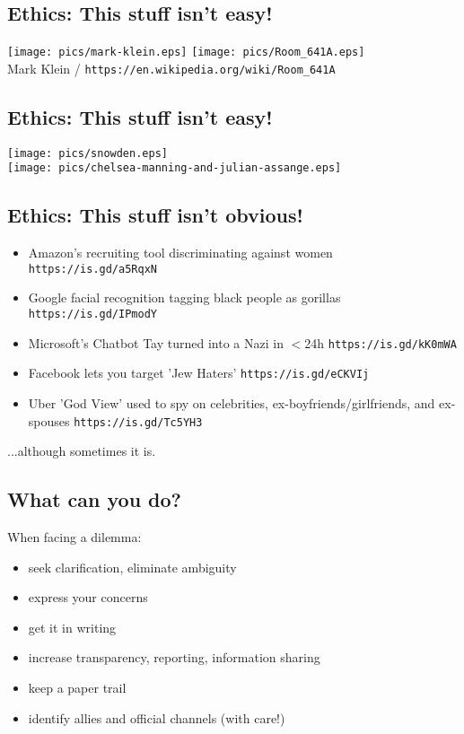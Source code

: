 \documentclass[xga]{xdvislides}
\begin{document}
\subsection{Ethics: This stuff isn't easy!}
\vspace{.5in}
\begin{center}
       \texttt{[image: pics/mark-klein.eps]}
       \texttt{[image: pics/Room\_641A.eps]} \\

	\small
	Mark Klein / {\tt https://en.wikipedia.org/wiki/Room\_641A}
	\Normalsize
\end{center}


\subsection{Ethics: This stuff isn't easy!}
\begin{center}
       \texttt{[image: pics/snowden.eps]} \\
       \texttt{[image: pics/chelsea-manning-and-julian-assange.eps]}
\end{center}

\subsection{Ethics: This stuff isn't obvious!}
\begin{itemize}
	\item Amazon's recruiting tool discriminating against women {\tt https://is.gd/a5RqxN}
	\item Google facial recognition tagging black people as gorillas {\tt https://is.gd/IPmodY}
	\item Microsoft's Chatbot Tay turned into a Nazi in $<$24h {\tt https://is.gd/kK0mWA}
	\item Facebook lets you target 'Jew Haters' {\tt https://is.gd/eCKVIj}
	\item Uber 'God View' used to spy on celebrities, ex-boyfriends/girlfriends, and ex-spouses {\tt https://is.gd/Tc5YH3}
\end{itemize}
\vspace{.5in}
...although sometimes it is.

\subsection{What can you do?}
When facing a dilemma:
\begin{itemize}
	\item seek clarification, eliminate ambiguity
	\item express your concerns
	\item get it in writing
	\item increase transparency, reporting, information sharing
	\item keep a paper trail
	\item identify allies and official channels (with care!)
\end{itemize}
\end{document}
